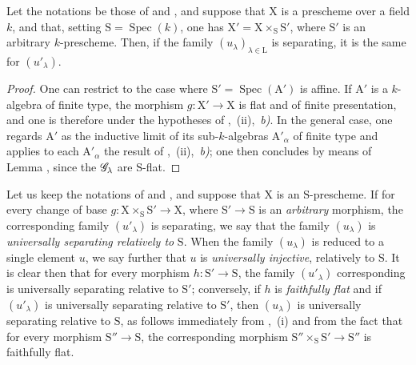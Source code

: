\begin{proposition}[11.9.13]
\label{IV.11.9.13}
Let the notations be those of  and , and suppose that $\mathrm{X}$ is a prescheme over a field $k$, and that, setting $\mathrm{S}=\operatorname{Spec}(k)$, one has $\mathrm{X}'=\mathrm{X}\times_\mathrm{S}\mathrm{S}'$, where $\mathrm{S}'$ is an arbitrary $k$-prescheme.
Then, if the family $(u_\lambda)_{\lambda\in\mathrm{L}}$ is separating, it is the same for $(u'_\lambda)$.
\end{proposition}

\begin{proof}
One can restrict to the case where $\mathrm{S}'=\operatorname{Spec}(\mathrm{A}')$ is affine.
If $\mathrm{A}'$ is a $k$-algebra of finite type, the morphism $g:\mathrm{X}'\to\mathrm{X}$ is flat and of finite presentation, and one is therefore under the hypotheses of ,~(ii),~\emph{b)}.
In the general case, one regards $\mathrm{A}'$ as the inductive limit of its sub-$k$-algebras $\mathrm{A}'_\alpha$ of finite type and applies to each $\mathrm{A}'_\alpha$ the result of ,~(ii),~\emph{b)}; one then concludes by means of Lemma , since the $\mathscr{G}_\lambda$ are $\mathrm{S}$-flat.
\end{proof}

\begin{env}[11.9.14]
\label{IV.11.9.14}
Let us keep the notations of  and , and suppose that $\mathrm{X}$ is an $\mathrm{S}$-prescheme.
If for every change of base $g:\mathrm{X}\times_\mathrm{S}\mathrm{S}'\to\mathrm{X}$, where $\mathrm{S}'\to\mathrm{S}$ is an \emph{arbitrary} morphism, the corresponding family $(u'_\lambda)$ is separating, we say that the family $(u_\lambda)$ is \emph{universally separating relatively to} $\mathrm{S}$.
When the family $(u_\lambda)$ is reduced to a single element $u$, we say further that $u$ is \emph{universally injective}, relatively to $\mathrm{S}$.
It is clear then that for every morphism $h:\mathrm{S}'\to\mathrm{S}$, the family $(u'_\lambda)$ corresponding is universally separating relative to $\mathrm{S}'$; conversely, if $h$ is \emph{faithfully flat} and if $(u'_\lambda)$ is universally separating relative to $\mathrm{S}'$, then $(u_\lambda)$ is universally separating relative to $\mathrm{S}$, as follows immediately from ,~(i) and from the fact that for every morphism $\mathrm{S}''\to\mathrm{S}$, the corresponding morphism $\mathrm{S}''\times_\mathrm{S}\mathrm{S}'\to\mathrm{S}''$ is faithfully flat.
\end{env}

